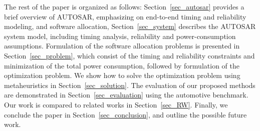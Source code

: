 The rest of the paper is organized as follows:
Section~\ref{sec_autosar} provides a brief overview of AUTOSAR, emphasizing on end-to-end timing and reliability modeling, and software allocation,
Section~\ref{sec_system} describes the AUTOSAR system model, including timing analysis, reliability and power-consumption assumptions.
Formulation of the software allocation problems is presented in Section~\ref{sec_problem}, which consist of the timing and reliability constraints and minimization of the total power consumption, followed by formulation of the optimization problem. 
We show how to solve the optimization problem using metaheuristics in Section~\ref{sec_solution}. The evaluation of our proposed methods are demonstrated in Section~\ref{sec_evaluation} using the automotive benchmark. Our work is compared to related works in Section~\ref{sec_RW}. Finally, we conclude the paper in Section~\ref{sec_conclusion}, and outline the possible future work.


